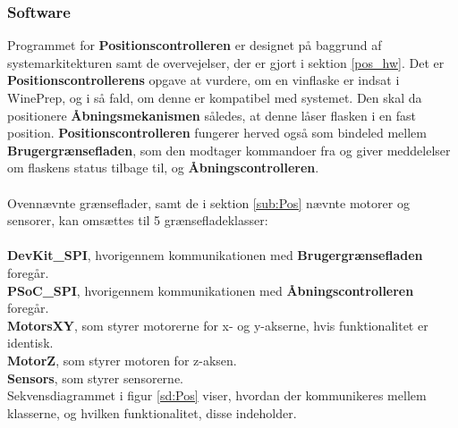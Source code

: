 \subsubsection{Software}
Programmet for \textbf{Positionscontrolleren} er designet på baggrund af systemarkitekturen samt de overvejelser, der er gjort i sektion \ref{pos_hw}. Det er \textbf{Positionscontrollerens} opgave at vurdere, om en vinflaske er indsat i WinePrep, og i så fald, om denne er kompatibel med systemet. Den skal da positionere \textbf{Åbningsmekanismen} således, at denne låser flasken i en fast position. \textbf{Positionscontrolleren} fungerer herved også som bindeled mellem \textbf{Brugergrænsefladen}, som den modtager kommandoer fra og giver meddelelser om flaskens status tilbage til, og \textbf{Åbningscontrolleren}. \\
\\
Ovennævnte grænseflader, samt de i sektion \ref{sub:Pos} nævnte motorer og sensorer, kan omsættes til 5 grænsefladeklasser: \\
\\
\textbf{DevKit\_SPI}, hvorigennem kommunikationen med \textbf{Brugergrænsefladen} foregår. \\
\textbf{PSoC\_SPI}, hvorigennem kommunikationen med \textbf{Åbningscontrolleren} foregår. \\
\textbf{MotorsXY}, som styrer motorerne for x- og y-akserne, hvis funktionalitet er identisk. \\
\textbf{MotorZ}, som styrer motoren for z-aksen. \\
\textbf{Sensors}, som styrer sensorerne. \\

Sekvensdiagrammet i figur \ref{sd:Pos} viser, hvordan der kommunikeres mellem klasserne, og hvilken funktionalitet, disse indeholder.

